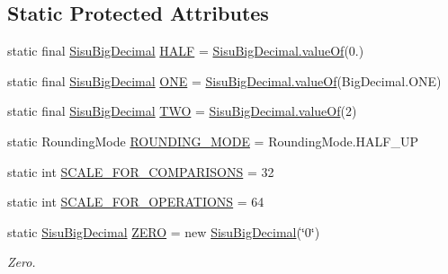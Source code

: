 \subsection*{Static Protected Attributes}
\begin{DoxyCompactItemize}
\item 
static final \hyperlink{classcom_1_1aarrelaakso_1_1drawl_1_1_sisu_big_decimal}{Sisu\+Big\+Decimal} \hyperlink{classcom_1_1aarrelaakso_1_1drawl_1_1_sisu_big_decimal_ae01ee6ac57cabf393e59465704a62f2c}{H\+A\+LF} = \hyperlink{classcom_1_1aarrelaakso_1_1drawl_1_1_sisu_big_decimal_a076ac8cd04ac04e39f7f3fcc7ce9a4a1}{Sisu\+Big\+Decimal.\+value\+Of}(0.)
\item 
static final \hyperlink{classcom_1_1aarrelaakso_1_1drawl_1_1_sisu_big_decimal}{Sisu\+Big\+Decimal} \hyperlink{classcom_1_1aarrelaakso_1_1drawl_1_1_sisu_big_decimal_a50a879aa4cb7468400bc4b0f2927f7f0}{O\+NE} = \hyperlink{classcom_1_1aarrelaakso_1_1drawl_1_1_sisu_big_decimal_a076ac8cd04ac04e39f7f3fcc7ce9a4a1}{Sisu\+Big\+Decimal.\+value\+Of}(Big\+Decimal.\+O\+NE)
\item 
static final \hyperlink{classcom_1_1aarrelaakso_1_1drawl_1_1_sisu_big_decimal}{Sisu\+Big\+Decimal} \hyperlink{classcom_1_1aarrelaakso_1_1drawl_1_1_sisu_big_decimal_a31b16f357b73bac1eef7b45326887b23}{T\+WO} = \hyperlink{classcom_1_1aarrelaakso_1_1drawl_1_1_sisu_big_decimal_a076ac8cd04ac04e39f7f3fcc7ce9a4a1}{Sisu\+Big\+Decimal.\+value\+Of}(2)
\item 
static Rounding\+Mode \hyperlink{classcom_1_1aarrelaakso_1_1drawl_1_1_sisu_big_decimal_afcdca984f764db570786fff2442142cb}{R\+O\+U\+N\+D\+I\+N\+G\+\_\+\+M\+O\+DE} = Rounding\+Mode.\+H\+A\+L\+F\+\_\+\+UP
\item 
static int \hyperlink{classcom_1_1aarrelaakso_1_1drawl_1_1_sisu_big_decimal_a5d8592149ed329cfd2f80ec81e790a9e}{S\+C\+A\+L\+E\+\_\+\+F\+O\+R\+\_\+\+C\+O\+M\+P\+A\+R\+I\+S\+O\+NS} = 32
\item 
static int \hyperlink{classcom_1_1aarrelaakso_1_1drawl_1_1_sisu_big_decimal_a5dfdeb68abdc4865a00b27136c6e8c54}{S\+C\+A\+L\+E\+\_\+\+F\+O\+R\+\_\+\+O\+P\+E\+R\+A\+T\+I\+O\+NS} = 64
\item 
static \hyperlink{classcom_1_1aarrelaakso_1_1drawl_1_1_sisu_big_decimal}{Sisu\+Big\+Decimal} \hyperlink{classcom_1_1aarrelaakso_1_1drawl_1_1_sisu_big_decimal_a5722f4f25f56502bda610b56ec3857be}{Z\+E\+RO} = new \hyperlink{classcom_1_1aarrelaakso_1_1drawl_1_1_sisu_big_decimal}{Sisu\+Big\+Decimal}(\char`\"{}0\char`\"{})
\begin{DoxyCompactList}\small\item\em Zero. \end{DoxyCompactList}\item 

\end{DoxyCompactItemize}
